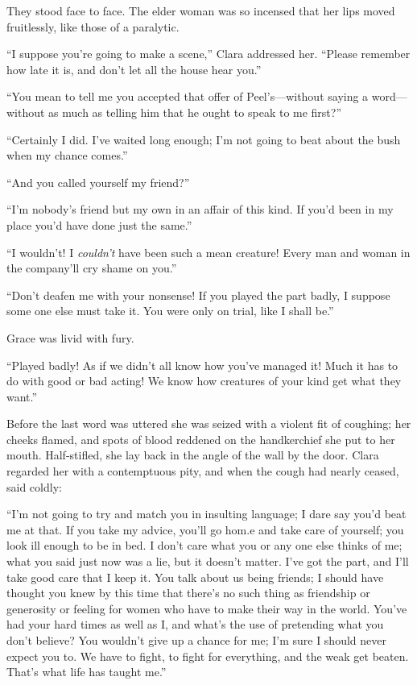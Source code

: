 They stood face to face. The elder woman was so incensed that her lips
moved fruitlessly, like those of a paralytic.

``I suppose you're going to make a scene,'' Clara addressed her.
``Please remember how late it is, and don't let all the house hear
you.''

``You mean to tell me you accepted that
{\protect\hypertarget{210}{}{}}offer of Peel's---without saying a
word---without as much as telling him that he ought to speak to me
first?''

``Certainly I did. I've waited long enough; I'm not going to beat about
the bush when my chance comes.''

``And you called yourself my friend?''

``I'm nobody's friend but my own in an affair of this kind. If you'd
been in my place you'd have done just the same.''

``I wouldn't! I \emph{couldn't} have been such a mean creature! Every
man and woman in the company'll cry shame on you.''

``Don't deafen me with your nonsense! If you played the part badly, I
suppose some one else must take it. You were only on trial, like I shall
be.''

Grace was livid with fury.

``Played badly! As if we didn't all know how you've managed it! Much it
has to do with good or bad acting! We know how creatures of your kind
get what they want.''

Before the last word was uttered she was seized with a violent fit of
coughing; her {\protect\hypertarget{211}{}{}}cheeks flamed, and spots of
blood reddened on the handkerchief she put to her mouth. Half-stifled,
she lay back in the angle of the wall by the door. Clara regarded her
with a contemptuous pity, and when the cough had nearly ceased, said
coldly:

``I'm not going to try and match you in insulting language; I dare say
you'd beat me at that. If you take my advice, you'll go hom.e and take
care of yourself; you look ill enough to be in bed. I don't care what
you or any one else thinks of me; what you said just now was a lie, but
it doesn't matter. I've got the part, and I'll take good care that I
keep it. You talk about us being friends; I should have thought you knew
by this time that there's no such thing as friendship or generosity or
feeling for women who have to make their way in the world. You've had
your hard times as well as I, and what's the use of pretending what you
don't believe? You wouldn't give up a chance for me; I'm sure I should
never expect you to. We have to fight, to fight for everything, and the
weak {\protect\hypertarget{212}{}{}}get beaten. That's what life has
taught me.''

